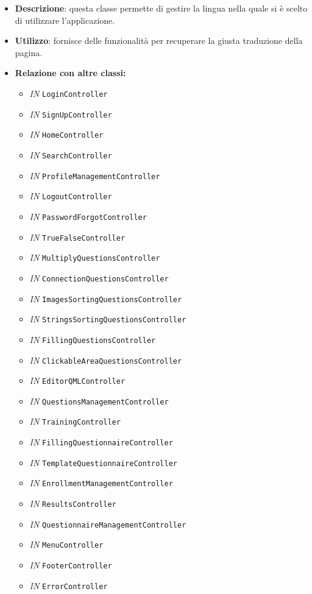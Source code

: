 \begin{itemize}
	\item \textbf{Descrizione}: questa classe permette di gestire la lingua nella quale si è scelto di utilizzare l'applicazione.
	\item \textbf{Utilizzo}: fornisce delle funzionalità per recuperare la giusta traduzione della pagina.
	\item \textbf{Relazione con altre classi:}
	\begin{itemize}
		\item \textit{IN} \texttt{LoginController} 
		\item \textit{IN} \texttt{SignUpController} 
		\item \textit{IN} \texttt{HomeController} 
		\item \textit{IN} \texttt{SearchController} 
		\item \textit{IN} \texttt{ProfileManagementController} 
		\item \textit{IN} \texttt{LogoutController} 
		\item \textit{IN} \texttt{PasswordForgotController}
		\item \textit{IN} \texttt{TrueFalseController} 
		\item \textit{IN} \texttt{MultiplyQuestionsController} 
		\item \textit{IN} \texttt{ConnectionQuestionsController} 
		\item \textit{IN} \texttt{ImagesSortingQuestionsController} 
		\item \textit{IN} \texttt{StringsSortingQuestionsController} 
		\item \textit{IN} \texttt{FillingQuestionsController} 
		\item \textit{IN} \texttt{ClickableAreaQuestionsController} 
		\item \textit{IN} \texttt{EditorQMLController} 
		\item \textit{IN} \texttt{QuestionsManagementController} 
		\item \textit{IN} \texttt{TrainingController} 
		\item \textit{IN} \texttt{FillingQuestionnaireController} 
		\item \textit{IN} \texttt{TemplateQuestionnaireController} 
		\item \textit{IN} \texttt{EnrollmentManagementController} 
		\item \textit{IN} \texttt{ResultsController} 
		\item \textit{IN} \texttt{QuestionnaireManagementController} 
		\item \textit{IN} \texttt{MenuController} 
		\item \textit{IN} \texttt{FooterController} 
		\item \textit{IN} \texttt{ErrorController} 
		

\end{itemize}
\end{itemize}
